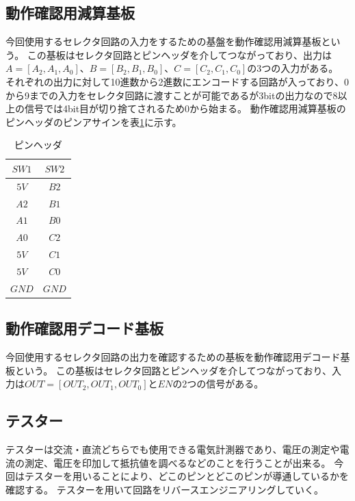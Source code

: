 \documentclass[a4paper,11pt]{ltjsarticle}
\begin{document}
\subsection{動作確認用減算基板}
今回使用するセレクタ回路の入力をするための基盤を動作確認用減算基板という。
この基板はセレクタ回路とピンヘッダを介してつながっており、出力は$A= [A_2, A_1, A_0]$、$B = [B_2, B_1, B_0]$、$C = [C_2, C_1, C_0]$の3つの入力がある。
それぞれの出力に対して10進数から2進数にエンコードする回路が入っており、0から9までの入力をセレクタ回路に渡すことが可能であるが3bitの出力なので8以上の信号では4bit目が切り捨てされるため0から始まる。
動作確認用減算基板のピンヘッダのピンアサインを表\ref{tab:pin}に示す。
\begin{table}[htbp]
  \centering
  \caption{ピンヘッダ}
  \label{tab:pin}
  \begin{tabular}{|c|c|}
    \hline
    $SW1$  & $SW2$  \\
    \hline
    $5V$ & $B2$ \\
    $A2$ & $B1$ \\
    $A1$ & $B0$ \\
    $A0$ & $C2$ \\
    $5V$ & $C1$ \\
    $5V$ & $C0$ \\
    $GND$ & $GND$ \\
    \hline
  \end{tabular}
\end{table}
\subsection{動作確認用デコード基板}
今回使用するセレクタ回路の出力を確認するための基板を動作確認用デコード基板という。
この基板はセレクタ回路とピンヘッダを介してつながっており、入力は$OUT = [OUT_2,OUT_1,OUT_0]$と$EN$の2つの信号がある。
\subsection{テスター}
テスターは交流・直流どちらでも使用できる電気計測器であり、電圧の測定や電流の測定、電圧を印加して抵抗値を調べるなどのことを行うことが出来る。
今回はテスターを用いることにより、どこのピンとどこのピンが導通しているかを確認する。
テスターを用いて回路をリバースエンジニアリングしていく。
\end{document}
